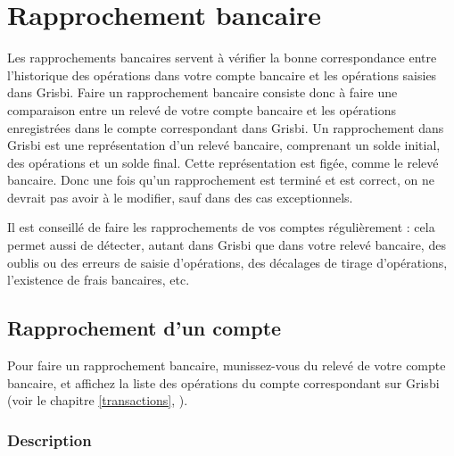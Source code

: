 
\chapter{Rapprochement bancaire\label{reconciliation}}


Les rapprochements bancaires servent à vérifier la bonne correspondance entre l'historique des opérations dans votre compte bancaire et les opérations saisies dans Grisbi. Faire un rapprochement bancaire consiste donc à faire une comparaison entre un relevé de votre compte  bancaire et les opérations enregistrées dans le compte correspondant dans Grisbi. Un rapprochement dans Grisbi est une représentation d'un relevé bancaire, comprenant un solde initial, des opérations et un solde final. Cette représentation est figée, comme le relevé bancaire. Donc une fois qu'un rapprochement est terminé et est correct, on ne devrait pas avoir à le modifier, sauf dans des cas exceptionnels.

Il est conseillé de faire les rapprochements de vos comptes régulièrement : cela permet aussi de détecter, autant dans Grisbi que dans votre relevé bancaire, des oublis ou des erreurs de saisie d'opérations, des décalages de tirage d'opérations, l'existence de frais bancaires, etc.


\section{Rapprochement d'un compte\label{reconciliation-account}}


Pour faire un rapprochement bancaire, munissez-vous du relevé de votre compte bancaire, et affichez la liste des opérations du compte correspondant sur Grisbi (voir le chapitre \vref{transactions}, ).


\subsection{Description\label{reconciliation-account-description}}

